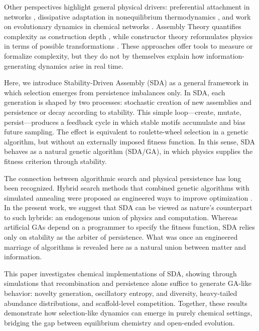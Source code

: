 \documentclass[life,article,submit,pdftex,moreauthors]{Definitions/mdpi}
\begin{document}
Other perspectives highlight general physical drivers: preferential attachment in networks \cite{barabasi1999emergence}, dissipative adaptation in nonequilibrium thermodynamics \cite{prigogine1977self, england2015dissipative}, and work on evolutionary dynamics in chemical networks \cite{wu2012origin, nowak2006evolutionary}. Assembly Theory quantifies complexity as construction depth \cite{walker2023nature}, while constructor theory reformulates physics in terms of possible transformations \cite{deutsch2013constructor}. These approaches offer tools to measure or formalize complexity, but they do not by themselves explain how information-generating dynamics arise in real time.

Here, we introduce Stability-Driven Assembly (SDA) as a general framework in which selection emerges from persistence imbalances only. In SDA, each generation is shaped by two processes: stochastic creation of new assemblies and persistence or decay according to stability. This simple loop—create, mutate, persist—produces a feedback cycle in which stable motifs accumulate and bias future sampling. The effect is equivalent to roulette-wheel selection in a genetic algorithm, but without an externally imposed fitness function. In this sense, SDA behaves as a natural genetic algorithm (SDA/GA), in which physics supplies the fitness criterion through stability.

The connection between algorithmic search and physical persistence has long been recognized. Hybrid search methods that combined genetic algorithms with simulated annealing were proposed as engineered ways to improve optimization \cite{adler1993marriage}. In the present work, we suggest that SDA can be viewed as nature’s counterpart to such hybrids: an endogenous union of physics and computation. Whereas artificial GAs depend on a programmer to specify the fitness function, SDA relies only on stability as the arbiter of persistence. What was once an engineered marriage of algorithms is revealed here as a natural union between matter and information.

This paper investigates chemical implementations of SDA, showing through simulations that recombination and persistence alone suffice to generate GA-like behavior: novelty generation, oscillatory entropy, and diversity, heavy-tailed abundance distributions, and scaffold-level competition. Together, these results demonstrate how selection-like dynamics can emerge in purely chemical settings, bridging the gap between equilibrium chemistry and open-ended evolution.
\end{document}
